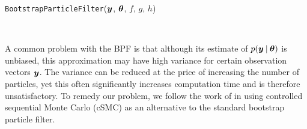 \documentclass{article}
\begin{document}
\begin{algorithm}
\caption{\texttt{BootstrapParticleFilter}($\boldsymbol{y}$, $\boldsymbol{\theta}$, $f$, $g$, $h$)} \label{bpf}
  \begin{algorithmic}
    \EndFor
   	 \EndFor
    \EndFor \\
   \end{algorithmic}
\end{algorithm}


\noindent A common problem with the BPF is that although its estimate of $p(\boldsymbol{y} \:\vert\: \boldsymbol{\theta})$ is unbiased, this approximation may have high variance for certain observation vectors $\boldsymbol{y}$.  The variance can be reduced at the price of increasing the number of particles, yet this often significantly increases computation time and is therefore unsatisfactory.  To remedy our problem, we follow the work of \cite{heng2017controlled} in using controlled sequential Monte Carlo (cSMC) as an alternative to the standard bootstrap particle filter. 
\end{document}

